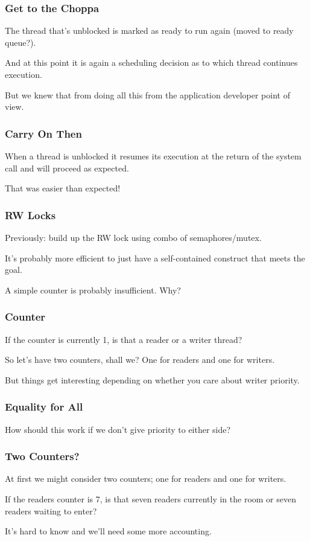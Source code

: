 \begin{frame}
\frametitle{Get to the Choppa}

The thread that's unblocked is marked as ready to run again (moved to ready queue?). 

And at this point it is again a scheduling decision as to which thread continues execution. 

But we knew that from doing all this from the application developer point of view.

\end{frame}

\begin{frame}
\frametitle{Carry On Then}

When a thread is unblocked it resumes its execution at the return of the system call and will proceed as expected.

That was easier than expected!

\end{frame}

\begin{frame}
\frametitle{RW Locks}

Previously: build up the RW lock using combo of semaphores/mutex.


It's probably more efficient to just have a self-contained construct that meets the goal.

A simple counter is probably insufficient. Why?

\end{frame}

\begin{frame}
\frametitle{Counter}

If the counter is currently 1, is that a reader or a writer thread?

So let's have two counters, shall we? One for readers and one for writers.

But things get interesting depending on whether you care about writer priority.

\end{frame}

\begin{frame}
\frametitle{Equality for All}

How should this work if we don't give priority to either side?

\end{frame}

\begin{frame}
\frametitle{Two Counters?}

At first we might consider two counters; one for readers and one for writers. 

If the readers counter is 7, is that seven readers currently in the room or seven readers waiting to enter? 

It's hard to know and we'll need some more accounting.

\end{frame}

